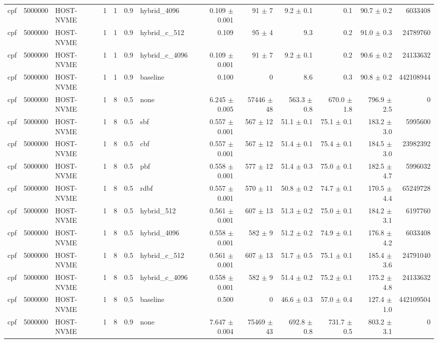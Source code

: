 \begin{tabular}{lllllllrrrrrr}
cpf & 5000000 & HOST-NVME & 1 & 1 & 0.9 & hybrid\_4096 & 0.109 $\pm$ 0.001 & 91 $\pm$ 7 & 9.2 $\pm$ 0.1 & 0.1 & 90.7 $\pm$ 0.2 & 6033408 \\
cpf & 5000000 & HOST-NVME & 1 & 1 & 0.9 & hybrid\_c\_512 & 0.109 & 95 $\pm$ 4 & 9.3 & 0.2 & 91.0 $\pm$ 0.3 & 24789760 \\
cpf & 5000000 & HOST-NVME & 1 & 1 & 0.9 & hybrid\_c\_4096 & 0.109 $\pm$ 0.001 & 91 $\pm$ 7 & 9.2 $\pm$ 0.1 & 0.2 & 90.6 $\pm$ 0.2 & 24133632 \\
cpf & 5000000 & HOST-NVME & 1 & 1 & 0.9 & baseline & 0.100 & 0 & 8.6 & 0.3 & 90.8 $\pm$ 0.2 & 442108944 \\
cpf & 5000000 & HOST-NVME & 1 & 8 & 0.5 & none & 6.245 $\pm$ 0.005 & 57446 $\pm$ 48 & 563.3 $\pm$ 0.8 & 670.0 $\pm$ 1.8 & 796.9 $\pm$ 2.5 & 0 \\
cpf & 5000000 & HOST-NVME & 1 & 8 & 0.5 & sbf & 0.557 $\pm$ 0.001 & 567 $\pm$ 12 & 51.1 $\pm$ 0.1 & 75.1 $\pm$ 0.1 & 183.2 $\pm$ 3.0 & 5995600 \\
cpf & 5000000 & HOST-NVME & 1 & 8 & 0.5 & cbf & 0.557 $\pm$ 0.001 & 567 $\pm$ 12 & 51.4 $\pm$ 0.1 & 75.4 $\pm$ 0.1 & 184.5 $\pm$ 3.0 & 23982392 \\
cpf & 5000000 & HOST-NVME & 1 & 8 & 0.5 & pbf & 0.558 $\pm$ 0.001 & 577 $\pm$ 12 & 51.4 $\pm$ 0.3 & 75.0 $\pm$ 0.1 & 182.5 $\pm$ 4.7 & 5996032 \\
cpf & 5000000 & HOST-NVME & 1 & 8 & 0.5 & rdbf & 0.557 $\pm$ 0.001 & 570 $\pm$ 11 & 50.8 $\pm$ 0.2 & 74.7 $\pm$ 0.1 & 170.5 $\pm$ 4.4 & 65249728 \\
cpf & 5000000 & HOST-NVME & 1 & 8 & 0.5 & hybrid\_512 & 0.561 $\pm$ 0.001 & 607 $\pm$ 13 & 51.3 $\pm$ 0.2 & 75.0 $\pm$ 0.1 & 184.2 $\pm$ 3.1 & 6197760 \\
cpf & 5000000 & HOST-NVME & 1 & 8 & 0.5 & hybrid\_4096 & 0.558 $\pm$ 0.001 & 582 $\pm$ 9 & 51.2 $\pm$ 0.2 & 74.9 $\pm$ 0.1 & 176.8 $\pm$ 4.2 & 6033408 \\
cpf & 5000000 & HOST-NVME & 1 & 8 & 0.5 & hybrid\_c\_512 & 0.561 $\pm$ 0.001 & 607 $\pm$ 13 & 51.7 $\pm$ 0.5 & 75.1 $\pm$ 0.1 & 185.4 $\pm$ 3.6 & 24791040 \\
cpf & 5000000 & HOST-NVME & 1 & 8 & 0.5 & hybrid\_c\_4096 & 0.558 $\pm$ 0.001 & 582 $\pm$ 9 & 51.4 $\pm$ 0.2 & 75.2 $\pm$ 0.1 & 175.2 $\pm$ 4.8 & 24133632 \\
cpf & 5000000 & HOST-NVME & 1 & 8 & 0.5 & baseline & 0.500 & 0 & 46.6 $\pm$ 0.3 & 57.0 $\pm$ 0.4 & 127.4 $\pm$ 1.0 & 442109504 \\
cpf & 5000000 & HOST-NVME & 1 & 8 & 0.9 & none & 7.647 $\pm$ 0.004 & 75469 $\pm$ 43 & 692.8 $\pm$ 0.8 & 731.7 $\pm$ 0.5 & 803.2 $\pm$ 3.1 & 0 \\

\end{tabular}
